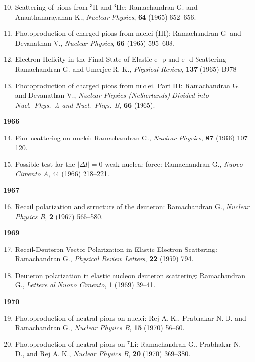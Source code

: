 \begin{enumerate}
\setcounter{enumi}{9}
\item Scattering of pions from $^{3}$H and $^{3}$He: Ramachandran G. and Ananthanarayanan K., \textit{Nuclear Physics}, {\bf 64} (1965) 652--656.
\item Photoproduction of charged pions from nuclei (III): Ramachandran G. and Devanathan V., \textit{Nuclear Physics}, {\bf 66} (1965) 595--608.
\item Electron Helicity in the Final State of Elastic e- p and e- d Scattering: Ramachandran G. and Umerjee R. K., \textit{Physical Review}, {\bf 137} (1965) B978
\item Photoproduction of charged pions from nuclei. Part III: Ramachandran G. and Devanathan V., \textit{Nuclear Physics (Netherlands) Divided into Nucl.\  Phys.\ A and Nucl.\ Phys.\ B}, {\bf 66} (1965).
\end{enumerate}
\textbf{1966}
\begin{enumerate}
\setcounter{enumi}{13}
\item Pion scattering on nuclei: Ramachandran G., \textit{Nuclear Physics}, {\bf 87} (1966) 107--120.
\item Possible test for the $|\Delta I|=0$ weak nuclear force: Ramachandran G., \textit{Nuovo Cimento A}, 44 (1966) 218--221.
\end{enumerate}
\textbf{1967}
\begin{enumerate}
\setcounter{enumi}{15}
\item Recoil polarization and structure of the deuteron: Ramachandran G., \textit{Nuclear Physics B}, {\bf 2} (1967) 565--580.
\end{enumerate}
\textbf{1969}
\begin{enumerate}
\setcounter{enumi}{16}
\item Recoil-Deuteron Vector Polarization in Elastic Electron Scattering: Ramachandran G., \textit{Physical Review Letters}, {\bf 22} (1969) 794.
\item Deuteron polarization in elastic nucleon deuteron scattering: Ramachandran G., \textit{Lettere al Nuovo Cimento}, {\bf 1} (1969) 39--41.
\end{enumerate}
\textbf{1970}
\begin{enumerate}
\setcounter{enumi}{18}
\item Photoproduction of neutral pions on nuclei: Rej A. K., Prabhakar N. D. and Ramachandran G., \textit{Nuclear Physics B}, {\bf 15} (1970) 56--60.
\item Photoproduction of neutral pions on $^{7}$Li: Ramachandran G., Prabhakar N. D., and Rej A. K., \textit{Nuclear Physics B}, {\bf 20} (1970) 369--380.
\end{enumerate}
